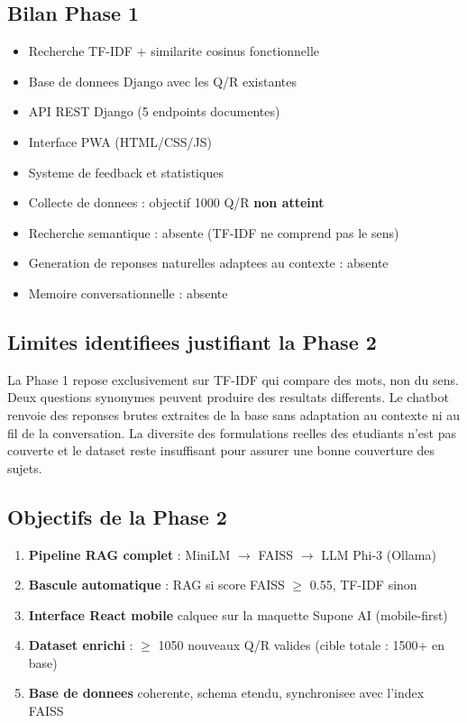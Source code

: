\documentclass[11pt,a4paper]{article}
\renewcommand{\checkmark}{\ding{52}}
\newcommand{\xmark}{\ding{56}}
\begin{document}
\subsection{Bilan Phase 1}

\begin{phase2box}
\begin{itemize}
    \item[\checkmark] Recherche TF-IDF + similarite cosinus fonctionnelle
    \item[\checkmark] Base de donnees Django avec les Q/R existantes
    \item[\checkmark] API REST Django (5 endpoints documentes)
    \item[\checkmark] Interface PWA (HTML/CSS/JS)
    \item[\checkmark] Systeme de feedback et statistiques
    \item[\xmark] Collecte de donnees : objectif 1000 Q/R \textbf{non atteint}
    \item[\xmark] Recherche semantique : absente (TF-IDF ne comprend pas le sens)
    \item[\xmark] Generation de reponses naturelles adaptees au contexte : absente
    \item[\xmark] Memoire conversationnelle : absente
\end{itemize}
\end{phase2box}

\subsection{Limites identifiees justifiant la Phase 2}

La Phase 1 repose exclusivement sur TF-IDF qui compare des mots, non du sens. Deux questions synonymes peuvent produire des resultats differents. Le chatbot renvoie des reponses brutes extraites de la base sans adaptation au contexte ni au fil de la conversation. La diversite des formulations reelles des etudiants n'est pas couverte et le dataset reste insuffisant pour assurer une bonne couverture des sujets.

\subsection{Objectifs de la Phase 2}

\begin{enumerate}
    \item \textbf{Pipeline RAG complet} : MiniLM $\rightarrow$ FAISS $\rightarrow$ LLM Phi-3 (Ollama)
    \item \textbf{Bascule automatique} : RAG si score FAISS $\geq$ 0.55, TF-IDF sinon
    \item \textbf{Interface React mobile} calquee sur la maquette Supone AI (mobile-first)
    \item \textbf{Dataset enrichi} : $\geq$ 1050 nouveaux Q/R valides (cible totale : 1500+ en base)
    \item \textbf{Base de donnees} coherente, schema etendu, synchronisee avec l'index FAISS
\end{enumerate}
\end{document}
